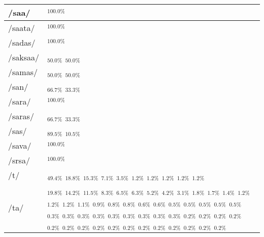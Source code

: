 \documentclass{article}
\begin{document}
\begin{longtable}{|l|p{}|}
/saa/ & \textIndus{}$_{100.0\%}$ \\ \hline
/saata/ & \textIndus{}$_{100.0\%}$ \\ \hline
/sadas/ & \textIndus{}$_{100.0\%}$ \\ \hline
/saksaa/ & \textIndus{}$_{50.0\%}$ \quad \textIndus{}$_{50.0\%}$ \\ \hline
/samas/ & \textIndus{}$_{50.0\%}$ \quad \textIndus{}$_{50.0\%}$ \\ \hline
/san/ & \textIndus{}$_{66.7\%}$ \quad \textIndus{}$_{33.3\%}$ \\ \hline
/sara/ & \textIndus{}$_{100.0\%}$ \\ \hline
/saras/ & \textIndus{}$_{66.7\%}$ \quad \textIndus{}$_{33.3\%}$ \\ \hline
/sas/ & \textIndus{}$_{89.5\%}$ \quad \textIndus{}$_{10.5\%}$ \\ \hline
/sava/ & \textIndus{}$_{100.0\%}$ \\ \hline
/srsa/ & \textIndus{}$_{100.0\%}$ \\ \hline
/t/ & \textIndus{}$_{49.4\%}$ \quad \textIndus{}$_{18.8\%}$ \quad \textIndus{}$_{15.3\%}$ \quad \textIndus{}$_{7.1\%}$ \quad \textIndus{}$_{3.5\%}$ \quad \textIndus{}$_{1.2\%}$ \quad \textIndus{}$_{1.2\%}$ \quad \textIndus{}$_{1.2\%}$ \quad \textIndus{}$_{1.2\%}$ \quad \textIndus{}$_{1.2\%}$ \\ \hline
/ta/ & \textIndus{}$_{19.8\%}$ \quad \textIndus{}$_{14.2\%}$ \quad \textIndus{}$_{11.5\%}$ \quad \textIndus{}$_{8.3\%}$ \quad \textIndus{}$_{6.5\%}$ \quad \textIndus{}$_{6.3\%}$ \quad \textIndus{}$_{5.2\%}$ \quad \textIndus{}$_{4.2\%}$ \quad \textIndus{}$_{3.1\%}$ \quad \textIndus{}$_{1.8\%}$ \quad \textIndus{}$_{1.7\%}$ \quad \textIndus{}$_{1.4\%}$ \quad \textIndus{}$_{1.2\%}$ \quad \textIndus{}$_{1.2\%}$ \quad \textIndus{}$_{1.2\%}$ \quad \textIndus{}$_{1.1\%}$ \quad \textIndus{}$_{0.9\%}$ \quad \textIndus{}$_{0.8\%}$ \quad \textIndus{}$_{0.8\%}$ \quad \textIndus{}$_{0.6\%}$ \quad \textIndus{}$_{0.6\%}$ \quad \textIndus{}$_{0.5\%}$ \quad \textIndus{}$_{0.5\%}$ \quad \textIndus{}$_{0.5\%}$ \quad \textIndus{}$_{0.5\%}$ \quad \textIndus{}$_{0.5\%}$ \quad \textIndus{}$_{0.3\%}$ \quad \textIndus{}$_{0.3\%}$ \quad \textIndus{}$_{0.3\%}$ \quad \textIndus{}$_{0.3\%}$ \quad \textIndus{}$_{0.3\%}$ \quad \textIndus{}$_{0.3\%}$ \quad \textIndus{}$_{0.3\%}$ \quad \textIndus{}$_{0.3\%}$ \quad \textIndus{}$_{0.3\%}$ \quad \textIndus{}$_{0.2\%}$ \quad \textIndus{}$_{0.2\%}$ \quad \textIndus{}$_{0.2\%}$ \quad \textIndus{}$_{0.2\%}$ \quad \textIndus{}$_{0.2\%}$ \quad \textIndus{}$_{0.2\%}$ \quad \textIndus{}$_{0.2\%}$ \quad \textIndus{}$_{0.2\%}$ \quad \textIndus{}$_{0.2\%}$ \quad \textIndus{}$_{0.2\%}$ \quad \textIndus{}$_{0.2\%}$ \quad \textIndus{}$_{0.2\%}$ \quad \textIndus{}$_{0.2\%}$ \quad \textIndus{}$_{0.2\%}$ \quad \textIndus{}$_{0.2\%}$ \quad \textIndus{}$_{0.2\%}$ \\ \hline

\end{longtable}
\end{document}
